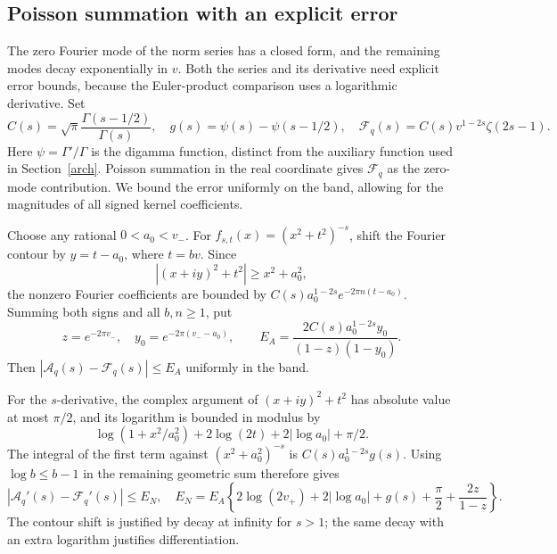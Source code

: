 \documentclass[11pt]{article}
\begin{document}
\subsection{Poisson summation with an explicit error}\label{poisson}
The zero Fourier mode of the norm series has a closed form, and the
remaining modes decay exponentially in \(v\). Both the series and
its derivative need explicit error bounds, because the Euler-product
comparison uses a logarithmic derivative.
Set
\[
 C(s)=\sqrt\pi\frac{\Gamma(s-1/2)}{\Gamma(s)},\quad
 g(s)=\psi(s)-\psi(s-1/2),\quad
 \mathcal F_q(s)=C(s)v^{1-2s}\zeta(2s-1).
\]
Here \(\psi=\Gamma'/\Gamma\) is the digamma function, distinct
from the auxiliary function used in Section~\ref{arch}.
Poisson summation in the real coordinate gives
\(\mathcal F_q\) as the zero-mode contribution. We bound the error
uniformly on the band, allowing for the magnitudes of all signed
kernel coefficients.

Choose any rational \(0<a_0<v_-\). For
\(f_{s,t}(x)=(x^2+t^2)^{-s}\), shift the Fourier contour by
\(y=t-a_0\), where \(t=bv\). Since
\[
 |(x+iy)^2+t^2|\ge x^2+a_0^2,
\]
the nonzero Fourier coefficients are bounded by
\(C(s)a_0^{1-2s}e^{-2\pi n(t-a_0)}\). Summing both signs and
all \(b,n\ge1\), put
\[
 z=e^{-2\pi v_-},\quad y_0=e^{-2\pi(v_--a_0)},\qquad
 E_A=\frac{2C(s)a_0^{1-2s}y_0}{(1-z)(1-y_0)}.
\]
Then \(|\mathcal A_q(s)-\mathcal F_q(s)|\le E_A\) uniformly in
the band.

For the \(s\)-derivative, the complex argument of
\((x+iy)^2+t^2\) has absolute value at most \(\pi/2\), and its
logarithm is bounded in modulus by
\[
 \log(1+x^2/a_0^2)+2\log(2t)+2|\log a_0|+\pi/2.
\]
The integral of the first term against
\((x^2+a_0^2)^{-s}\) is
\(C(s)a_0^{1-2s}g(s)\). Using \(\log b\le b-1\) in the remaining
geometric sum therefore gives
\begin{equation}\label{EN}
 |\mathcal A_q'(s)-\mathcal F_q'(s)|\le E_N,
 \quad E_N=E_A\left\{2\log(2v_+)+2|\log a_0|+g(s)+\frac\pi2
                                      +\frac{2z}{1-z}\right\}.
\end{equation}
The contour shift is justified by decay at infinity for \(s>1\);
the same decay with an extra logarithm justifies differentiation.
\end{document}
